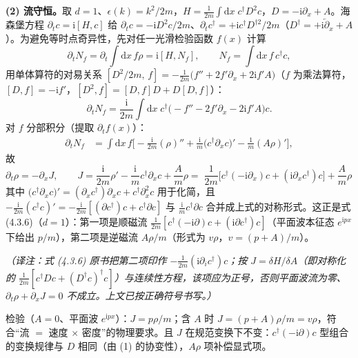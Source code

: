 \textbf{(2) 流守恒。}取 $d=1$、$\epsilon(k)=k^2/2m$，$H=\frac{1}{2m}\int\mathrm{d}x\;c^\dagger D^2c$，$D=-\mathrm{i}\partial_x+A$。海森堡方程 $\partial_t c=\mathrm{i}[H,c]$ 给 $\partial_tc=-\mathrm{i}D^2c/2m$、$\partial_tc^\dagger=+\mathrm{i}c^\dagger D^{\dagger2}/2m$（$D^\dagger=+\mathrm{i}\overleftarrow\partial_x+A$）。为避免等时点奇异性，先对任一光滑检验函数 $f(x)$ 计算
\begin{equation*}
\partial_tN_f=\partial_t\!\int\!\mathrm{d}x\,f\rho=\mathrm{i}[H,N_f],
\qquad N_f=\int\mathrm{d}x\,f\,c^\dagger c,
\end{equation*}
用单体算符的对易关系 $[D^2/2m,\,f]=-\frac{1}{2m}\big(f''+2f'\partial_x+2\mathrm{i}f'A\big)$（$f$ 为乘法算符，$[D,f]=-\mathrm{i}f'$，$[D^2,f]=[D,f]D+D[D,f]$）：
\begin{equation*}
\partial_tN_f=\frac{\mathrm{i}}{2m}\int\mathrm{d}x\;c^\dagger\big(-f''-2f'\partial_x-2\mathrm{i}f'A\big)c .
\end{equation*}
对 $f$ 分部积分（提取 $\partial_tf(x)$）：
\begin{align*}
\partial_tN_f
&=\int\mathrm{d}x\,f\Big[-\frac{\mathrm{i}}{2m}(\rho)''+\frac{\mathrm{i}}{m}\big(c^\dagger\partial_xc\big)'-\frac{1}{m}(A\rho)'\Big],
\end{align*}
故
\begin{equation*}
\partial_t\rho=-\partial_xJ,\qquad
J=\frac{\mathrm{i}}{2m}\rho'-\frac{\mathrm{i}}{m}c^\dagger\partial_xc+\frac{A}{m}\rho
=\boxed{\;\frac{1}{2m}\Big[c^\dagger(-\mathrm{i}\partial_x)c+(\mathrm{i}\partial_xc^\dagger)c\Big]+\frac{A}{m}\rho\;}
\end{equation*}
其中 $\big(c^\dagger\partial_xc\big)'=(\partial_xc^\dagger)\partial_xc+c^\dagger\partial_x^2c$ 用于化简，且 $-\frac{\mathrm{i}}{2m}(c^\dagger c)'=-\frac{\mathrm{i}}{2m}[(\partial c^\dagger)c+c^\dagger\partial c]$ 与 $\frac{\mathrm{i}}{m}c^\dagger\partial c$ 合并成上式的对称形式。这正是式 (4.3.6)（$d=1$）：第一项是顺磁流 $\frac{1}{2m}[c^\dagger(-\mathrm{i}\partial)c+(\mathrm{i}\partial c^\dagger)c]$（平面波本征态 $e^{\mathrm{i}px}$ 下给出 $p/m$），第二项是逆磁流 $A\rho/m$（形式为 $v\rho$，$v=(p+A)/m$）。

\emph{（译注：式 (4.3.6) 原书把第二项印作 $-\frac{1}{2m}(\mathrm{i}\partial_ic^\dagger)c$；按 $J=\delta H/\delta A$（即对称化的 $\frac{1}{2m}[c^\dagger D c+(D^\dagger c)^\dagger c]$）与连续性方程，该项应为正号，否则平面波流为零、$\partial_t\rho+\partial_xJ=0$ 不成立。上文已按正确符号书写。）}

检验（$A=0$、平面波 $e^{\mathrm{i}px}$）：$J=p\rho/m$；含 $A$ 时 $J=(p+A)\rho/m=v\rho$，符合“流 $=$ 速度 $\times$ 密度”的物理要求。且 $J$ 在规范变换下不变：$c^\dagger(-\mathrm{i}\partial) c$ 型组合的变换规律与 $D$ 相同（由 (1) 的协变性），$A\rho$ 项补偿显式项。

